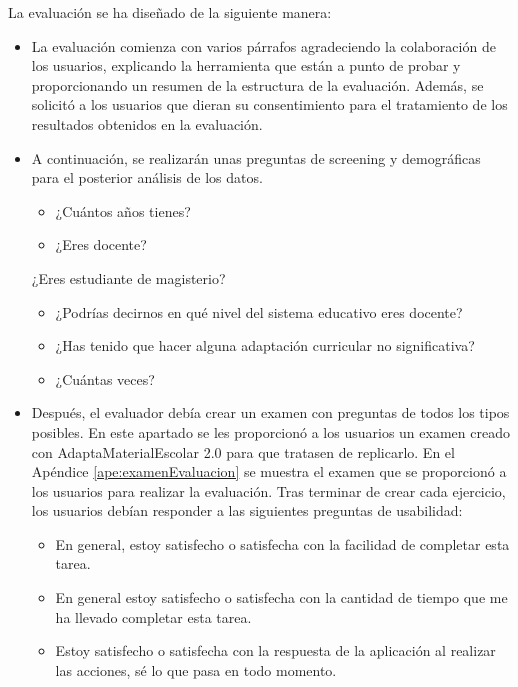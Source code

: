 La evaluación se ha diseñado de la siguiente manera:
\begin{itemize}
    \item La evaluación comienza con varios párrafos agradeciendo la colaboración de los usuarios, explicando la herramienta que están a punto de probar y proporcionando un resumen de la estructura de la evaluación. Además, se solicitó a los usuarios que dieran su consentimiento para el tratamiento de los resultados obtenidos en la evaluación.
    \item A continuación, se realizarán unas preguntas de screening y demográficas para el posterior análisis de los datos.
          \begin{itemize}
              \item ¿Cuántos años tienes?
              \item ¿Eres docente?
          \end{itemize}
          ¿Eres estudiante de magisterio? 
          \begin{itemize}
              \item ¿Podrías decirnos en qué nivel del sistema educativo eres docente?
              \item ¿Has tenido que hacer alguna adaptación curricular no significativa?
              \item ¿Cuántas veces?
          \end{itemize}
    \item Después, el evaluador debía crear un examen con preguntas de todos los tipos posibles. En este apartado se les proporcionó a los usuarios un examen creado con AdaptaMaterialEscolar 2.0 para que tratasen de replicarlo. En el Apéndice \ref{ape:examenEvaluacion} se muestra el examen que se proporcionó a los usuarios para realizar la evaluación. Tras terminar de crear cada ejercicio, los usuarios debían responder a las siguientes preguntas de usabilidad:
          \begin{itemize}
              \item En general, estoy  satisfecho o satisfecha con la facilidad de completar esta tarea.
              \item En general estoy  satisfecho o satisfecha con la cantidad de tiempo que me ha llevado completar esta tarea.
              \item Estoy  satisfecho o satisfecha con la respuesta de la aplicación al realizar las acciones, sé lo que pasa en todo momento.
          \end{itemize}


\end{itemize}
